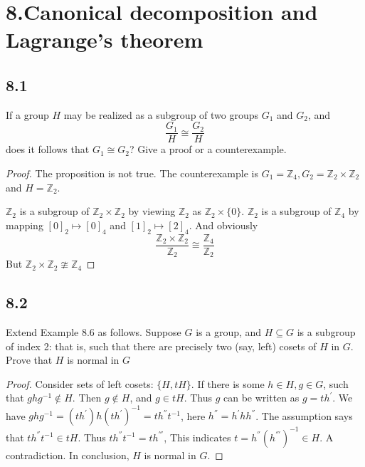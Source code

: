 \documentclass[a4paper, pdf, 12pt]{article}
\begin{document}
\section*{8.Canonical decomposition and Lagrange’s theorem}
\subsection*{8.1}
If a group $H$ may be realized as a subgroup of two groups $G_1$ and $G_2$, and
$$
\frac{G_1}{H} \cong \frac{G_2}{H}
$$
does it follows that $G_1 \cong G_2$? Give a proof or a counterexample.

\begin{proof}
  The proposition is not true. The counterexample is $G_1 = \mathbb{Z}_{4}, G_2 = \mathbb{Z}_{2}\times \mathbb{Z}_{2}$
  and $H = \mathbb{Z}_{2}$. 
  
  $\mathbb{Z}_{2}$ is a subgroup of $\mathbb{Z}_{2}\times \mathbb{Z}_{2}$ by viewing $\mathbb{Z}_{2}$
  as $\mathbb{Z}_{2}\times \{0\}$. $\mathbb{Z}_{2}$ is a subgroup of $\mathbb{Z}_{4}$ by mapping $[0]_{2}\mapsto [0]_{4}$ and $[1]_{2}\mapsto [2]_{4}$.
  And obviously $$
  \frac{\mathbb{Z}_{2}\times \mathbb{Z}_{2}}{\mathbb{Z}_{2}} \cong \frac{\mathbb{Z}_{4}}{\mathbb{Z}_{2}}
  $$
  But $\mathbb{Z}_{2}\times \mathbb{Z}_{2}\ncong \mathbb{Z}_{4}$
\end{proof}

\subsection*{8.2}
Extend Example $8.6$ as follows. Suppose $G$ is a group, and $H \subseteq G$ is a
subgroup of index 2: that is, such that there are precisely two (say, left) cosets of
$H$ in $G$. Prove that $H$ is normal in $G$

\begin{proof}
  Consider sets of left cosets: $\{H, tH\}$. If there is some $h\in H, g\in G$, such that 
  $ghg^{-1}\notin H$. Then $g\notin H$, and $g \in tH$. Thus $g$ can be written as $g = th^{'}$. 
  We have $ghg^{-1} = (th^{'})h(th^{'})^{-1} = th^{''}t^{-1}$, here $h^{''} = h^{'}hh^{''}$. The assumption
  says that $th^{''}t^{-1}\in tH$. Thus $th^{''}t^{-1} = th^{'''}$, This indicates $t = h^{''}(h^{'''})^{-1}\in H$. 
  A contradiction. In conclusion, $H$ is normal in $G$.
\end{proof}
\end{document}

